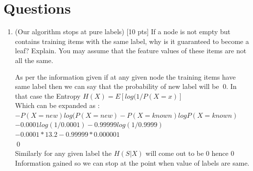 \documentclass[a4paper]{article}
\theoremstyle{definition}
\newenvironment{soln}{
    \leavevmode\color{blue}\ignorespaces
}{}
\begin{document}
\section{Questions}
\begin{enumerate}
\item (Our algorithm stops at pure labels) [10 pts] If a node is not empty but contains training items with the same label, why is it guaranteed to become a leaf?  Explain. You may assume that the feature values of these items are not all the same. \\
\begin{soln}
    As per the information given if at any given node the training items have same label then we can say that the probability of new label will be $~0$. In that case the Entropy $H(X)=E[log(1/P(X=x)]$\\
    Which can be expanded as :\\
    $-P(X=new)log(P(X=new)-P(X=known)logP(X=known)$\\
    $-0.0001log(1/0.0001)-0.99999log(1/0.9999)$\\
    $-0.0001*13.2-0.99999*0.000001$\\
    $~0$ \\
    Similarly for any given label the $H(S|X)$ will come out to be 0 hence 0 Information gained so we can stop at the point when value of labels are same.
\end{soln}


\end{enumerate}
\end{document}
